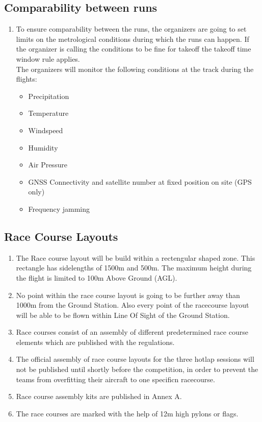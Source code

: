     \subsection{Comparability between runs}
    \begin{enumerate}
      \item To ensure comparability between the runs, the organizers are going to set limits on the metrological conditions during which the runs can happen. If the organizer is calling the conditions to be fine for takeoff the takeoff time window rule applies. \\
      The organizers will monitor the following conditions at the track during the flights:
      \begin{itemize}
        \item Precipitation
        \item Temperature 
        \item Windspeed
        \item Humidity
        \item Air Pressure
        \item GNSS Connectivity and satellite number at fixed position on site (GPS only) 
        \item Frequency jamming
      \end{itemize}
    \end{enumerate}

    \subsection{Race Course Layouts}
    \begin{enumerate}
      \item The Race course layout will be build within a rectengular shaped zone. This rectangle has sidelengths of 1500m and 500m. The maximum height during the flight is limited to 100m Above Ground (AGL).
      \item No point within the race course layout is going to be further away than 1000m from the Ground Station. Also every point of the racecourse layout will be able to be flown within Line Of Sight of the Ground Station. 
      \item Race courses consist of an assembly of different predetermined race course elements which are published with the regulations.
      \item The official assembly of race course layouts for the three hotlap sessions will not be published until shortly before the competition, in order to prevent the teams from overfitting their aircraft to one specificn racecourse. 
      \item Race course assembly kits are published in Annex A. 
      \item The race courses are marked with the help of 12m high pylons or flags. 
    \end{enumerate}


